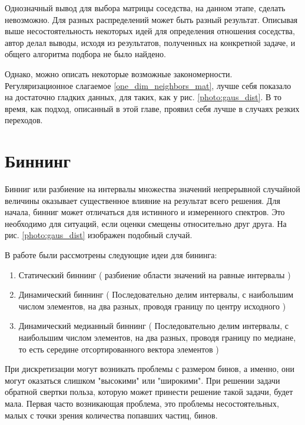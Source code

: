 \documentclass[a4paper,12pt]{diplom}
\begin{document}
Однозначный вывод для выбора матрицы соседства, на данном этапе, сделать невозможно. Для разных распределений может быть разный результат. 
Описывая выше несостоятельность некоторых идей для определения отношения соседства, автор делал выводы, исходя из результатов, полученных на 
конкретной задаче, и общего алгоритма подбора не было найдено.

Однако, можно описать некоторые возможные закономерности. Регуляризационное слагаемое \eqref{one_dim_neighbors_mat}, лучше себя показало на 
достаточно гладких данных, для таких, как у рис. \ref{photo:gaus_dist}. В то время, как подход, описанный в этой главе, проявил себя лучше в 
случаях резких переходов.


\chapter{Биннинг}

Бинниг или разбиение на интервалы множества значений непрерывной случайной величины оказывает существенное влияние на результат всего решения.
Для начала, бинниг может отличаться для истинного и измеренного спектров. Это необходимо для ситуаций, если оценки смещены относительно друг друга. 
На рис. \ref{photo:gaus_dist} изображен подобный случай.

В работе были рассмотрены следующие идеи для бининга:

\begin{enumerate}
   \item Статический биннинг ( разбиение области значений на равные интервалы ) \\
   
   \item Динамический биннинг ( Последовательно делим интервалы, с наибольшим числом элементов, 
   на два разных, проводя границу по центру исходного ) \\

   \item Динамический медианный биннинг ( Последовательно делим интервалы, с наибольшим числом элементов, 
   на два разных, проводя границу по медиане, то есть середине отсортированного вектора элементов )
\end{enumerate}


При дискретизации могут возникать проблемы с размером бинов, а именно, они могут оказаться слишком "высокими" или "широкими". При решении задачи 
обратной свертки польза, которую может принести решение такой задачи, будет мала. Первая часто возникающая проблема, это проблемы несостоятельных,
малых с точки зрения количества попавших частиц, бинов. 
\end{document}
